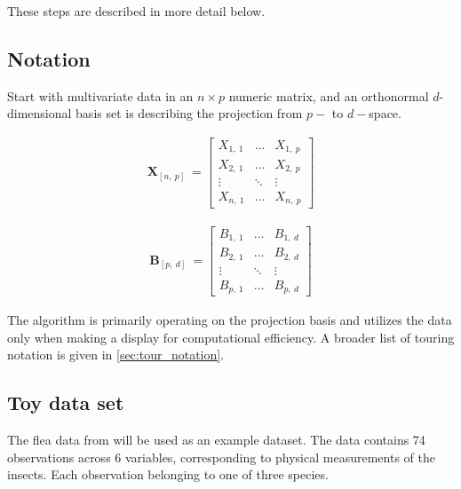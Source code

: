 \documentclass{monashthesis}
\begin{document}
These steps are described in more detail below.

\subsection{Notation}\label{notation}

Start with multivariate data in an \(n \times p\) numeric matrix, and an
orthonormal \(d\)-dimensional basis set is describing the projection
from \(p-\) to \(d-\)space.

\begin{align*}
  \textbf{X}_{[n,~p]} ~=
  \begin{bmatrix}
    X_{1,~1} & \dots  & X_{1,~p} \\
    X_{2,~1} & \dots  & X_{2,~p} \\
    \vdots   & \ddots & \vdots   \\
    X_{n,~1} & \dots  & X_{n,~p}
  \end{bmatrix}
\end{align*}

\begin{align*}
  \textbf{B}_{[p,~d]} ~=
  \begin{bmatrix}
    B_{1,~1} & \dots  & B_{1,~d} \\
    B_{2,~1} & \dots  & B_{2,~d} \\
    \vdots   & \ddots & \vdots   \\
    B_{p,~1} & \dots  & B_{p,~d}
  \end{bmatrix}
\end{align*}

The algorithm is primarily operating on the projection basis and
utilizes the data only when making a display for computational
efficiency. A broader list of touring notation is given in
\ref{sec:tour_notation}.

\subsection{Toy data set}\label{toy-data-set}

The flea data from \textcite{lubischew_use_1962} will be used as an
example dataset. The data contains 74 observations across 6 variables,
corresponding to physical measurements of the insects. Each observation
belonging to one of three species.
\end{document}
